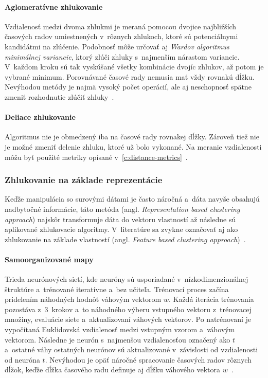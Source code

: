 \documentclass[a4paper,twoside,slovak,12pt,appendix]{article}
\begin{document}
\paragraph{Aglomeratívne zhlukovanie}
Vzdialenosť medzi dvoma zhlukmi je meraná pomocou dvojice najbližších časových
radov umiestnených v~rôznych zhlukoch, ktoré sú potenciálnymi kandidátmi na
zlúčenie. Podobnosť môže určovať aj
\textit{Wardov algoritmus minimálnej variancie}, ktorý zlúči zhluky
s~najmenším nárastom variancie. V~každom kroku sú tak vyskúšané všetky
kombinácie dvojíc zhlukov, až potom je vybrané minimum. Porovnávané časové rady
nemusia mať vždy rovnakú dĺžku. Nevýhodou metódy je najmä vysoký počet operácií,
ale aj neschopnosť spätne zmeniť rozhodnutie zlúčiť
zhluky~\cite{WarrenLiao2005}.

\paragraph{Deliace zhlukovanie}
Algoritmus nie je obmedzený iba na časové rady rovnakej dĺžky. Zároveň tiež nie
je možné zmeniť delenie zhluku, ktoré už bolo vykonané. Na meranie vzdialenosti
môžu byť použité metriky opísané
v~\ref{c:distance-metrics}~\cite{WarrenLiao2005}.


\subsubsection{Zhlukovanie na základe reprezentácie}
Keďže manipulácia so surovými dátami je často náročná a~dáta navyše obsahujú
nadbytočné informácie, táto metóda (angl. \textit{Representation based
clustering approach}) najskôr transformuje dáta do vektoru vlastností až
následne sú aplikované zhlukovacie algoritmy. V~literatúre sa zvykne označovať
aj ako zhlukovanie na základe vlastností (angl. \textit{Feature based clustering
approach})~\cite{Rani2012}.

\paragraph{Samoorganizované mapy}
Trieda neurónových sietí, kde neuróny sú usporiadané v~nízkodimenzionálnej
štruktúre a~trénované iteratívne a~bez učiteľa. Trénovací proces začína
pridelením náhodných hodnôt váhovým vektorom $w$. Každá iterácia trénovania
pozostáva z~3~krokov a~to náhodného výberu vstupného vektoru z~trénovacej
množiny, evaluácie siete a~aktualizovaní váhových vektorov. Po natrénovaní je
vypočítaná Euklidovská vzdialenosť medzi vstupným vzorom a~váhovým vektorom.
Následne je neurón s~najmenšou vzdialenosťou označený ako $t$ a~ostatné váhy
ostatných neurónov sú aktualizované v~závislosti od vzdialenosti od neuróna $t$.
Nevýhodou je opäť náročné spracovanie časových radov rôznych dĺžok, keďže dĺžka
časového radu definuje aj dĺžku váhového vektora
$w$~\cite{Kohonen2001,WarrenLiao2005}.
\end{document}
